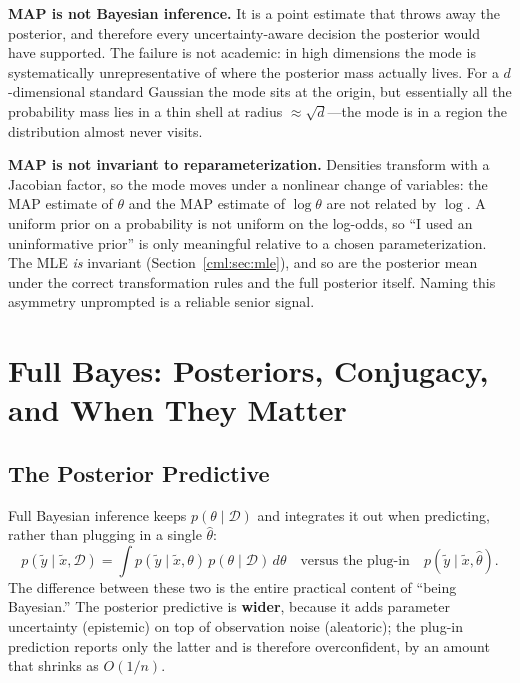 \textbf{MAP is not Bayesian inference.} It is a point estimate that throws away the posterior, and therefore every uncertainty-aware decision the posterior would have supported. The failure is not academic: in high dimensions the mode is systematically unrepresentative of where the posterior mass actually lives. For a $d$-dimensional standard Gaussian the mode sits at the origin, but essentially all the probability mass lies in a thin shell at radius $\approx \sqrt{d}$---the mode is in a region the distribution almost never visits.

\textbf{MAP is not invariant to reparameterization.} Densities transform with a Jacobian factor, so the mode moves under a nonlinear change of variables: the MAP estimate of $\theta$ and the MAP estimate of $\log\theta$ are not related by $\log$. A uniform prior on a probability is not uniform on the log-odds, so ``I used an uninformative prior'' is only meaningful relative to a chosen parameterization. The MLE \textit{is} invariant (Section~\ref{cml:sec:mle}), and so are the posterior mean under the correct transformation rules and the full posterior itself. Naming this asymmetry unprompted is a reliable senior signal.

\section{Full Bayes: Posteriors, Conjugacy, and When They Matter}
\label{cml:sec:bayes}

\subsection{The Posterior Predictive}

Full Bayesian inference keeps $p(\theta \mid \mathcal{D})$ and integrates it out when predicting, rather than plugging in a single $\hat\theta$:
\begin{equation}
p(\tilde y \mid \tilde x, \mathcal{D}) = \int p(\tilde y \mid \tilde x, \theta)\, p(\theta \mid \mathcal{D})\, d\theta
\quad\text{versus the plug-in}\quad p(\tilde y \mid \tilde x, \hat\theta).
\end{equation}
The difference between these two is the entire practical content of ``being Bayesian.'' The posterior predictive is \textbf{wider}, because it adds parameter uncertainty (epistemic) on top of observation noise (aleatoric); the plug-in prediction reports only the latter and is therefore overconfident, by an amount that shrinks as $O(1/n)$.

